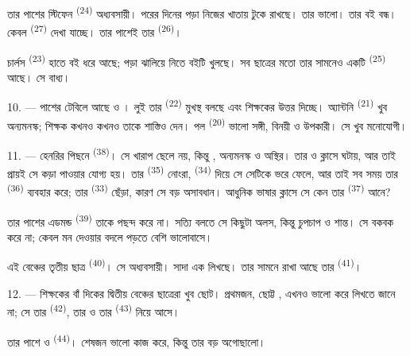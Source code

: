 তার পাশের স্টিফেন \textsuperscript{(24)} অধ্যবসায়ী। পরের দিনের পড়া নিজের
খাতায় টুকে রাখছে। তার  ভালো। তার বই বন্ধ। কেবল
 \textsuperscript{(27)} দেখা যাচ্ছে। তার পাশেই তার
 \textsuperscript{(26)}।

চার্লস \textsuperscript{(23)} হাতে বই ধরে আছে; পড়া ঝালিয়ে নিতে বইটি খুলছে।
সব ছাত্রের মতো তার সামনেও একটি  \textsuperscript{(25)} আছে। সে
বাধ্য।

10. --- পাশের টেবিলে আছে  ও । লুই তার
 \textsuperscript{(22)} মুখস্থ বলছে এবং শিক্ষকের 
উত্তর দিচ্ছে। অ্যান্টনি \textsuperscript{(21)} খুব অন্যমনস্ক; শিক্ষক কখনও কখনও
তাকে শাস্তিও দেন। পল \textsuperscript{(20)} ভালো সঙ্গী, বিনয়ী ও উপকারী। সে খুব
মনোযোগী।

\VUsaut{4.2mm}
\VUsaut{3.2mm}

11. --- হেনরির পিছনে  \textsuperscript{(38)}। সে খারাপ ছেলে নয়,
কিন্তু , অন্যমনস্ক ও অস্থির। তার  ও
 ক্লাসে  ঘটায়, আর তাই প্রায়ই সে কড়া
 পাওয়ার যোগ্য হয়। তার 
\textsuperscript{(35)} নোংরা,  \textsuperscript{(34)} দিয়ে সে সেটিকে
 ভরে ফেলে, আর তাই সব সময় তার 
\textsuperscript{(36)} ব্যবহার করে; তার  \textsuperscript{(33)} ছেঁড়া,
কারণ সে বড় অসাবধান। আধুনিক ভাষার ক্লাসে সে কেন তার 
\textsuperscript{(37)} আনে?

তার পাশের এডমন্ড \textsuperscript{(39)} তাকে পছন্দ করে না। সত্যি বলতে সে কিছুটা
অলস, কিন্তু চুপচাপ ও শান্ত। সে বকবক করে না; কেবল মন দেওয়ার বদলে
  পড়তে বেশি ভালোবাসে।

এই বেঞ্চের তৃতীয় ছাত্র  \textsuperscript{(40)}। সে
অধ্যবসায়ী। সাদা এক  লিখছে। তার সামনে রাখা আছে তার
 \textsuperscript{(41)}।

12. --- শিক্ষকের বাঁ দিকের দ্বিতীয় বেঞ্চের ছাত্রেরা খুব ছোট। প্রথমজন,
ছোট্ট , এখনও ভালো করে লিখতে জানে না; সে তার 
\textsuperscript{(42)}, তার  ও তার 
\textsuperscript{(43)} নিয়ে আসে।

তার পাশে  ও  \textsuperscript{(44)}। শেষজন ভালো
কাজ করে, কিন্তু তার  বড় অগোছালো।


